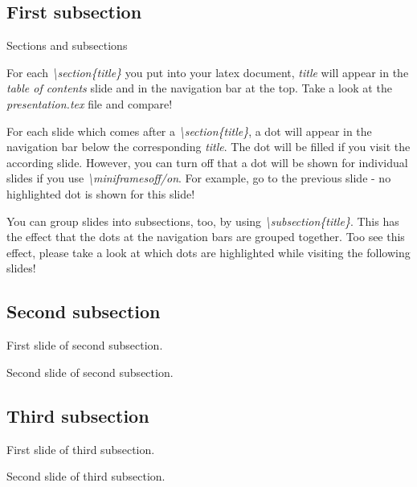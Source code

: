 \subsection{First subsection}

\begin{frame}{Sections and subsections}

  For each \textit{\textbackslash section\{title\}} you put into your latex document, \textit{title} will appear in the \textit{table of contents} slide and in the navigation bar at the top. Take a look at the \textit{presentation.tex} file and compare! \\
  
  \vspace{0.4cm}
  
  For each slide which comes after a \textit{\textbackslash section\{title\}}, a dot will appear in the navigation bar below the corresponding \textit{title}. The dot will be filled if you visit the according slide. However, you can turn  off that a dot will be shown for individual slides if you use \textit{\textbackslash miniframesoff/on}. For example, go to the previous slide - no highlighted dot is shown for this slide!
    
  \vspace{0.4cm}
  
  You can group slides into subsections, too, by using \textit{\textbackslash subsection\{title\}}. This has the effect that the dots at the navigation bars are grouped together. Too see this effect, please take a look at which dots are highlighted while visiting the following slides!
  
\end{frame}

\subsection{Second subsection}

\begin{frame}{}

  First slide of second subsection.

\end{frame}

\begin{frame}{}

  Second slide of second subsection.

\end{frame}

\subsection{Third subsection}

\begin{frame}{}

  First slide of third subsection.

\end{frame}

\begin{frame}{}

  Second slide of third subsection.

\end{frame}